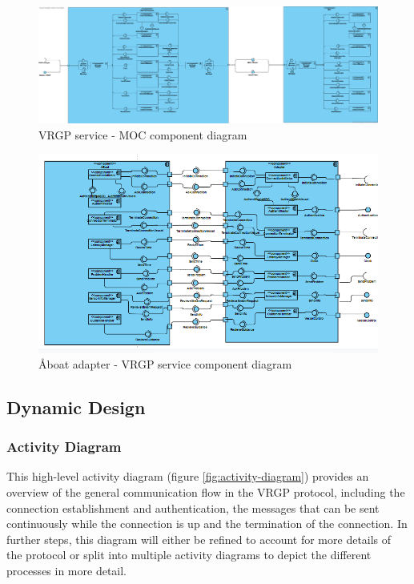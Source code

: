 \begin{figure}[h!]
	\centering
	\includegraphics[width=\linewidth]{diagrams/ComponentDiagram_GenericVrgpMicroservice_HandlerView}
	\caption{VRGP service - MOC component diagram}
	\label{fig:vrgp-moc-component-diagram}
\end{figure}

\begin{figure}[h!]
	\centering
	\includegraphics[width=\linewidth]{diagrams/components_adapter}
	\caption{Åboat adapter - VRGP service component diagram}
	\label{fig:adapter-vrgp-component-diagram}
\end{figure}

\subsection{Dynamic Design}\label{sec:dynamic-design}

\subsubsection{Activity Diagram}

This high-level activity diagram (figure \ref{fig:activity-diagram}) provides an overview of the general communication flow in the VRGP protocol, including the connection establishment and authentication, the messages that can be sent continuously while the connection is up and the termination of the connection. In further steps, this diagram will either be refined to account for more details of the protocol or split into multiple activity diagrams to depict the different processes in more detail.

